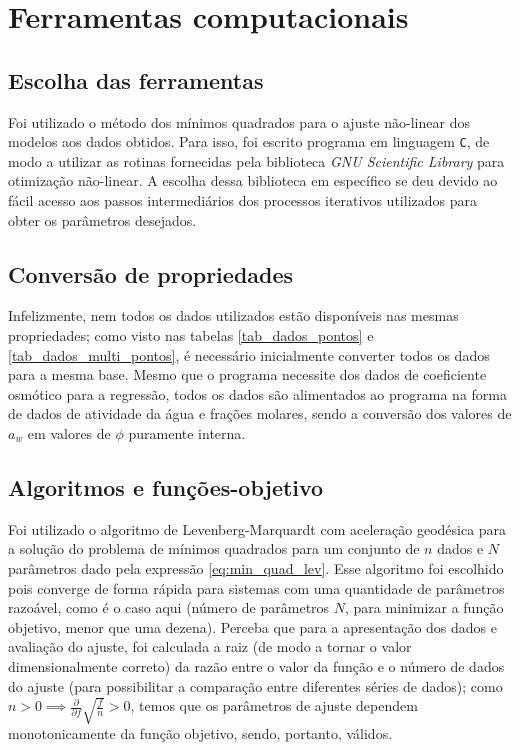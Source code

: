 \part{Ferramentas computacionais}

\chapter{Escolha das ferramentas}

Foi utilizado o método dos mínimos quadrados para o ajuste não-linear dos
modelos aos dados obtidos. Para isso, foi escrito programa em linguagem
\texttt{C}, de modo a utilizar as rotinas fornecidas pela biblioteca
\textit{GNU Scientific Library} \cite{galassi_book} para otimização não-linear.
A escolha dessa biblioteca em específico se deu devido ao fácil acesso aos
passos intermediários dos processos iterativos utilizados para obter os
parâmetros desejados.

\chapter{Conversão de propriedades}

Infelizmente, nem todos os dados utilizados estão disponíveis nas mesmas
propriedades; como visto nas tabelas \ref{tab_dados_pontos} e
\ref{tab_dados_multi_pontos}, é necessário inicialmente converter todos os dados
para a mesma base. Mesmo que o programa necessite dos dados de coeficiente
osmótico para a regressão, todos os dados são alimentados ao programa na forma
de dados de atividade da água e frações molares, sendo a conversão dos valores de
$a_w$ em valores de $\phi$ puramente interna.

\chapter{Algoritmos e funções-objetivo}

Foi utilizado o algoritmo de Levenberg-Marquardt com aceleração geodésica para a
solução do problema de mínimos quadrados para um conjunto de $n$ dados e $N$
parâmetros dado pela expressão \ref{eq:min_quad_lev}.
Esse algoritmo foi escolhido pois converge de forma rápida para sistemas com
uma quantidade de parâmetros razoável, como é o caso aqui (número de parâmetros
$N$, para minimizar a função objetivo, menor que uma dezena).
Perceba que para a apresentação dos dados e avaliação do ajuste, foi calculada a
raiz (de modo a tornar o valor dimensionalmente correto) da razão entre o valor da
função e o número de dados do ajuste (para possibilitar a comparação entre
diferentes séries de dados); como
$n>0 \implies \frac{\partial}{\partial f}\sqrt{\frac{f}{n}} >0$, temos que os
parâmetros de ajuste dependem monotonicamente da função objetivo, sendo, portanto,
válidos.

